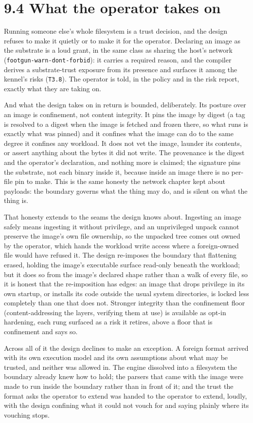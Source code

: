\hypertarget{what-the-operator-takes-on}{%
\section{9.4 What the operator takes
on}\label{what-the-operator-takes-on}}

Running someone else's whole filesystem is a trust decision, and the
design refuses to make it quietly or to make it for the operator.
Declaring an image as the substrate is a loud grant, in the same class
as sharing the host's network (\texttt{footgun-warn-dont-forbid}): it
carries a required reason, and the compiler derives a substrate-trust
exposure from its presence and surfaces it among the kennel's risks
(\texttt{T3.8}). The operator is told, in the policy and in the risk
report, exactly what they are taking on.

And what the design takes on in return is bounded, deliberately. Its
posture over an image is confinement, not content integrity. It pins the
image by digest (a tag is resolved to a digest when the image is fetched
and frozen there, so what runs is exactly what was pinned) and it
confines what the image can do to the same degree it confines any
workload. It does not vet the image, launder its contents, or assert
anything about the bytes it did not write. The provenance is the digest
and the operator's declaration, and nothing more is claimed; the
signature pins the substrate, not each binary inside it, because inside
an image there is no per-file pin to make. This is the same honesty the
network chapter kept about payloads: the boundary governs what the thing
may do, and is silent on what the thing is.

That honesty extends to the seams the design knows about. Ingesting an
image safely means ingesting it without privilege, and an unprivileged
unpack cannot preserve the image's own file ownership, so the unpacked
tree comes out owned by the operator, which hands the workload write
access where a foreign-owned file would have refused it. The design
re-imposes the boundary that flattening erased, holding the image's
executable surface read-only beneath the workload; but it does so from
the image's declared shape rather than a walk of every file, so it is
honest that the re-imposition has edges: an image that drops privilege
in its own startup, or installs its code outside the usual system
directories, is locked less completely than one that does not. Stronger
integrity than the confinement floor (content-addressing the layers,
verifying them at use) is available as opt-in hardening, each rung
surfaced as a risk it retires, above a floor that is confinement and
says so.

Across all of it the design declines to make an exception. A foreign
format arrived with its own execution model and its own assumptions
about what may be trusted, and neither was allowed in. The engine
dissolved into a filesystem the boundary already knew how to hold; the
parsers that came with the image were made to run inside the boundary
rather than in front of it; and the trust the format asks the operator
to extend was handed to the operator to extend, loudly, with the design
confining what it could not vouch for and saying plainly where its
vouching stops.
